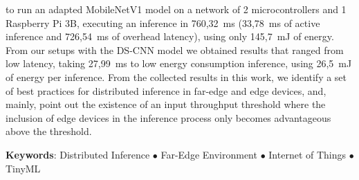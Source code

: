 to run an adapted MobileNetV1 model on a network of 2 microcontrollers and 1 Raspberry 
Pi 3B, executing an inference in 760,32~ms (33,78~ms of active inference and 726,54~ms 
of overhead latency), using only 145,7~mJ of energy. From our setups with the \ac{DS-CNN}
model we obtained results that ranged from low latency, taking 27,99~ms to low energy consumption
inference, using 26,5~mJ of energy per inference. From the collected results
in this work, we identify a set of best practices for distributed inference in far-edge
and edge devices, and, mainly, point out the existence of an input throughput threshold 
where the inclusion of edge devices in the inference process only becomes advantageous
above the threshold.

\vspace{\fill}
\begin{flushleft}
{\Large \textbf{Keywords}:} 
Distributed Inference \(\bullet\)
Far-Edge Environment \(\bullet\) 
Internet of Things \(\bullet\)
TinyML 
\end{flushleft}
\vspace*{24mm}

\acresetall %

